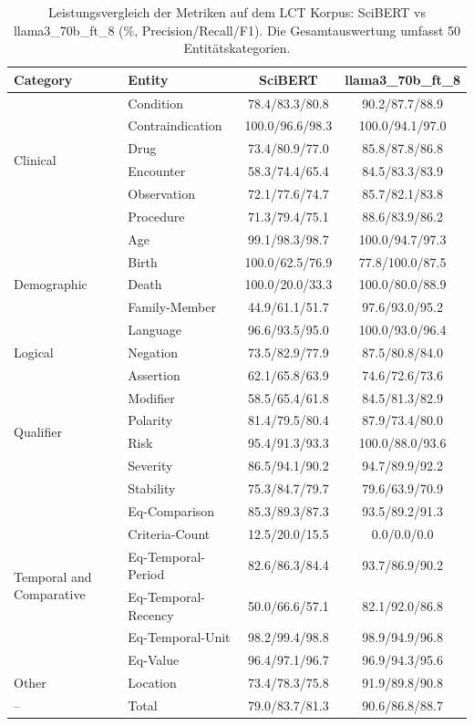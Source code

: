 
\begin{table}[htbp]
\centering
\begin{tabular}{llcc}
\toprule
\textbf{Category} & \textbf{Entity} & \textbf{SciBERT} & \textbf{llama3_70b_ft_8} \\
\midrule
\multirow{6}{*}{Clinical} & Condition & 78.4/83.3/80.8 & 90.2/87.7/88.9 \\
 & Contraindication & 100.0/96.6/98.3 & 100.0/94.1/97.0 \\
 & Drug & 73.4/80.9/77.0 & 85.8/87.8/86.8 \\
 & Encounter & 58.3/74.4/65.4 & 84.5/83.3/83.9 \\
 & Observation & 72.1/77.6/74.7 & 85.7/82.1/83.8 \\
 & Procedure & 71.3/79.4/75.1 & 88.6/83.9/86.2 \\
\midrule
\multirow{5}{*}{Demographic} & Age & 99.1/98.3/98.7 & 100.0/94.7/97.3 \\
 & Birth & 100.0/62.5/76.9 & 77.8/100.0/87.5 \\
 & Death & 100.0/20.0/33.3 & 100.0/80.0/88.9 \\
 & Family-Member & 44.9/61.1/51.7 & 97.6/93.0/95.2 \\
 & Language & 96.6/93.5/95.0 & 100.0/93.0/96.4 \\
\midrule
Logical & Negation & 73.5/82.9/77.9 & 87.5/80.8/84.0 \\
\midrule
\multirow{6}{*}{Qualifier} & Assertion & 62.1/65.8/63.9 & 74.6/72.6/73.6 \\
 & Modifier & 58.5/65.4/61.8 & 84.5/81.3/82.9 \\
 & Polarity & 81.4/79.5/80.4 & 87.9/73.4/80.0 \\
 & Risk & 95.4/91.3/93.3 & 100.0/88.0/93.6 \\
 & Severity & 86.5/94.1/90.2 & 94.7/89.9/92.2 \\
 & Stability & 75.3/84.7/79.7 & 79.6/63.9/70.9 \\
\midrule
\multirow{6}{*}{Temporal and Comparative} & Eq-Comparison & 85.3/89.3/87.3 & 93.5/89.2/91.3 \\
 & Criteria-Count & 12.5/20.0/15.5 & 0.0/0.0/0.0 \\
 & Eq-Temporal-Period & 82.6/86.3/84.4 & 93.7/86.9/90.2 \\
 & Eq-Temporal-Recency & 50.0/66.6/57.1 & 82.1/92.0/86.8 \\
 & Eq-Temporal-Unit & 98.2/99.4/98.8 & 98.9/94.9/96.8 \\
 & Eq-Value & 96.4/97.1/96.7 & 96.9/94.3/95.6 \\
\midrule
Other & Location & 73.4/78.3/75.8 & 91.9/89.8/90.8 \\
\midrule
-- & Total & 79.0/83.7/81.3 & 90.6/86.8/88.7 \\
\bottomrule
\end{tabular}
\caption{Leistungsvergleich der Metriken auf dem LCT Korpus: SciBERT vs llama3_70b_ft_8 (\%, Precision/Recall/F1). Die Gesamtauswertung umfasst 50 Entitätskategorien.}
\label{tab:metrics_comparison}
\end{table}
    